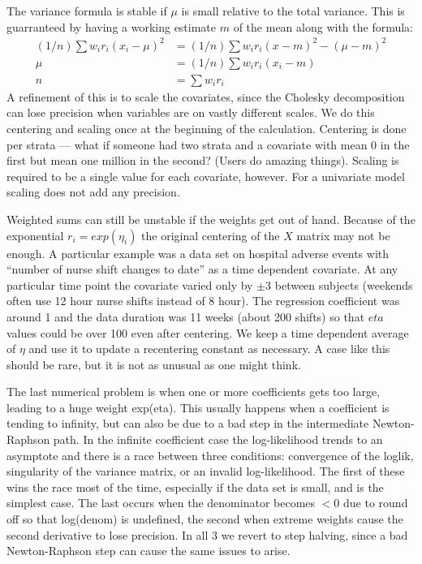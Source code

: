 \documentclass{article}
\begin{document}
The variance formula is stable if $\mu$ is small relative to
the total variance.  This is guarranteed by having a working estimate $m$
of the mean along with the formula:
\begin{align*}
  (1/n) \sum w_ir_i(x_i- \mu)^2 &= (1/n)\sum w_ir_i(x-m)^2 - 
           (\mu -m)^2 \\
   \mu &= (1/n) \sum w_ir_i (x_i -m)\\
    n &= \sum w_ir_i
\end{align*}
A refinement of this is to scale the covariates, since the Cholesky
decomposition can lose precision when variables are on vastly different
scales.  We do this centering and scaling once at the beginning of the
calculation.
Centering is done per strata --- what if someone had two strata and
a covariate with mean 0 in the first but mean one million in the second?
(Users do amazing things).  Scaling is required to be a single
value for each covariate, however.  For a univariate model scaling
does not add any precision.

Weighted sums can still be unstable if the weights get out of hand.
Because of the exponential $r_i = exp(\eta_i)$ 
the original centering of the $X$ matrix may not be enough. 
A particular example was a data set on hospital adverse events with
``number of nurse shift changes to date'' as a time dependent covariate.
At any particular time point the covariate varied only by $\pm 3$ between
subjects (weekends often use 12 hour nurse shifts instead of 8 hour).  The
regression coefficient was around 1 and the data duration was 11 weeks
(about 200 shifts) so that $eta$ values could be over 100 even after
centering.  We keep a time dependent average of $\eta$ and use it to update
a recentering constant as necessary. 
A case like this should be rare, but it is not as unusual as one might
think.

The last numerical problem is when one or more coefficients gets too
large, leading to a huge weight exp(eta).
This usually happens when a coefficient is tending to infinity, but can
also be due to a bad step in the intermediate Newton-Raphson path.
In the infinite coefficient case the
log-likelihood trends to an asymptote and there is a race between three
conditions: convergence of the loglik,  singularity of the variance matrix,
or an invalid log-likelihood.  The first of these wins the race most of
the time, especially if the data set is small, and is the simplest case.
The last occurs when the denominator becomes $<0$ due to
round off so that log(denom) is undefined, the second when extreme weights
cause the second derivative to lose precision.  
In all 3 we revert to step halving, since a bad Newton-Raphson step can
cause the same issues to arise.
\end{document}

